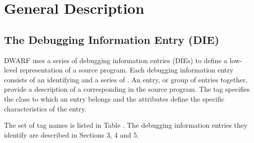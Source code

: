 \chapter{General Description}
\label{chap:generaldescription}
\section{The Debugging Information Entry (DIE)}
\label{chap:thedebuggingentrydie}
DWARF 
uses 
a series of debugging information entries (DIEs) to 
define a low-level
representation of a source program. 
Each debugging information entry consists of an identifying
 and a series of 
. 
An entry, or group of entries together, provide a description of a
corresponding 
 in the source program. 
The tag specifies the class to which an entry belongs
and the attributes define the specific characteristics of the entry.

The set of tag names 
is listed in Table . 
The debugging information entries they identify are
described in Sections 3, 4 and 5.



